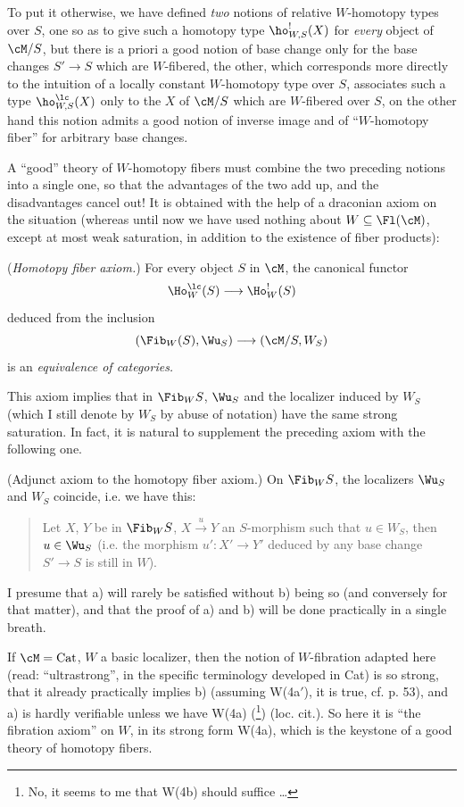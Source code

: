 To put it otherwise, we have defined \textit{two} notions of relative $W$-homotopy types over $S$, one so as to give such a homotopy type $\ho^!_{W,S}(X)$ for \textit{every} object of $\cM/S$, but there is a priori a good notion of base change only for the base changes $S' \longrightarrow S$ which are $W$-fibered, the other, which corresponds more directly to the intuition of a locally constant $W$-homotopy type over $S$, associates such a type $\ho^{\lc}_{W,S}(X)$ only to the $X$ of $\cM/S$ which are $W$-fibered over $S$, on the other hand this notion admits a good notion of inverse image and of ``$W$-homotopy fiber'' for arbitrary base changes.

A ``good'' theory of $W$-homotopy fibers must combine the two preceding notions into a single one, so that the advantages of the two add up, and the disadvantages cancel out! It is obtained with the help of a draconian axiom on the situation (whereas until now we have used nothing about $W \subseteq \Fl(\cM)$, except at most weak saturation, in addition to the existence of fiber products):

 (\textit{Homotopy fiber axiom.}) For every object $S$ in $\cM$, the canonical functor
\[
\Ho^{\lc}_W(S) \longrightarrow \Ho^!_W(S)
\]
deduced from the inclusion
\[
(\Fib_W(S), \Wu_S) \longrightarrow (\cM/S, W_S)
\]
is an \textit{equivalence of categories.}

This axiom implies that in $\Fib_W S$, $\Wu_S$ and the localizer induced by $W_S$ (which I still denote by $W_S$ by abuse of notation) have the same strong saturation. In fact, it is natural to supplement the preceding axiom with the following one.

 (Adjunct axiom to the homotopy fiber axiom.) On $\Fib_W S$, the localizers $\Wu_S$ and $W_S$ coincide, i.e. we have this:

\begin{quote}
Let $X$, $Y$ be in $\Fib_W S$, $X \xrightarrow{u} Y$ an $S$-morphism such that $u \in W_S$, then $u \in \Wu_S$ (i.e. the morphism $u' : X' \longrightarrow Y'$ deduced by any base change $S' \longrightarrow S$ is still in $W$).
\end{quote}

I presume that a) will rarely be satisfied without b) being so (and conversely for that matter), and that the proof of a) and b) will be done practically in a single breath.

If $\cM = \mathrm{Cat}$, $W$ a basic localizer, then the notion of $W$-fibration adapted here (read: ``ultrastrong'', in the specific terminology developed in Cat) is so strong, that it already practically implies b) (assuming W(4a$'$), it is true, cf. p. 53), and
a) is hardly verifiable unless we have W(4a) (\footnote[122]{No, it seems to me that W(4b) should suffice \dots}) (loc. cit.). So here it is ``the fibration axiom'' on $W$, in its strong form W(4a), which is the keystone of a good theory of homotopy fibers.

